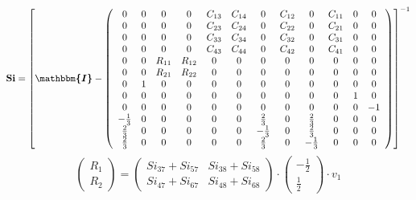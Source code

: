 \documentclass[10pt]{article} \usepackage{amsmath} \usepackage{bbold}
\begin{document}
\[ \mathbf{Si} = \left[ \boldsymbol{\mathbbm{I}}  -
\left(\begin{array}{cccccccccccc} 0 & 0 & 0 & 0 & C_{13} & C_{14} & 0
& C_{12} & 0 & C_{11} & 0 & 0 \\ 0 & 0 & 0 & 0 & C_{23} & C_{24} & 0 &
C_{22} & 0 & C_{21} & 0 & 0 \\ 0 & 0 & 0 & 0 & C_{33} & C_{34} & 0 &
C_{32} & 0 & C_{31} & 0 & 0 \\ 0 & 0 & 0 & 0 & C_{43} & C_{44} & 0 &
C_{42} & 0 & C_{41} & 0 & 0 \\ 0 & 0 & R_{11} & R_{12} & 0 & 0 & 0 & 0
& 0 & 0 & 0 & 0 \\ 0 & 0 & R_{21} & R_{22} & 0 & 0 & 0 & 0 & 0 & 0 & 0
& 0 \\ 0 & 1 & 0 & 0 & 0 & 0 & 0 & 0 & 0 & 0 & 0 & 0 \\ 0 & 0 & 0 & 0
& 0 & 0 & 0 & 0 & 0 & 0 & 1 & 0 \\ 0 & 0 & 0 & 0 & 0 & 0 & 0 & 0 & 0 &
0 & 0 & -1 \\ -\frac{1}{3} & 0 & 0 & 0 & 0 & 0 & \frac{2}{3} & 0 &
\frac{2}{3} & 0 & 0 & 0 \\ \frac{2}{3} & 0 & 0 & 0 & 0 & 0 &
-\frac{1}{3} & 0 & \frac{2}{3} & 0 & 0 & 0 \\ \frac{2}{3} & 0 & 0 & 0
& 0 & 0 & \frac{2}{3} & 0 & -\frac{1}{3} & 0 & 0 & 0
\end{array}\right) \right]^{-1} \]
\[ \left(\begin{array}{c} R_{1} \\ R_{2}
\end{array}\right)=\left(\begin{array}{cc} Si_{37} + Si_{57} & Si_{38}
+ Si_{58} \\ Si_{47} + Si_{67} & Si_{48} + Si_{68} \end{array}\right)
\cdot \left(\begin{array}{c} -\frac{1}{2} \\ \frac{1}{2}
\end{array}\right)\cdot v_{1} \]
\end{document}
